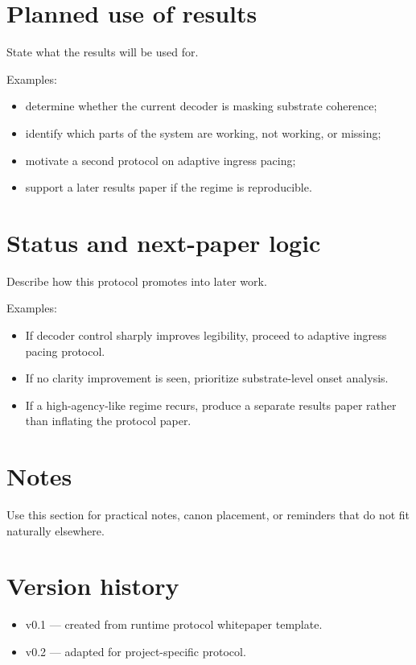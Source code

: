 \documentclass[11pt]{article}
\begin{document}
\section{Planned use of results}

State what the results will be used for.

Examples:
\begin{itemize}[leftmargin=1.5em]
  \item determine whether the current decoder is masking substrate coherence;
  \item identify which parts of the system are working, not working, or missing;
  \item motivate a second protocol on adaptive ingress pacing;
  \item support a later results paper if the regime is reproducible.
\end{itemize}

\section{Status and next-paper logic}

Describe how this protocol promotes into later work.

Examples:
\begin{itemize}[leftmargin=1.5em]
  \item If decoder control sharply improves legibility, proceed to adaptive ingress pacing protocol.
  \item If no clarity improvement is seen, prioritize substrate-level onset analysis.
  \item If a high-agency-like regime recurs, produce a separate results paper rather than inflating the protocol paper.
\end{itemize}

\section*{Notes}

Use this section for practical notes, canon placement, or reminders that do not fit naturally elsewhere.

\section*{Version history}
\begin{itemize}[leftmargin=1.5em]
  \item v0.1 --- created from runtime protocol whitepaper template.
  \item v0.2 --- adapted for project-specific protocol.
\end{itemize}
\end{document}
